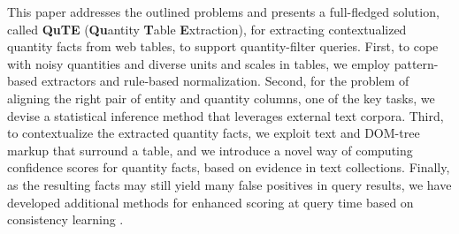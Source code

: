 \vspace{0.1cm}
%
%
This paper addresses the outlined problems and presents
a full-fledged solution, called {\bf QuTE} (\textbf{Qu}antity \textbf{T}able \textbf{E}xtraction), for extracting contextualized quantity facts
from web tables, to support quantity-filter queries. 
First, to cope with noisy quantities and diverse units and scales in tables, we employ pattern-based extractors and 
rule-based normalization.
Second, for the problem of aligning the right pair
of entity and quantity columns, one of the key tasks, 
we devise a statistical inference method
that leverages external text corpora.
Third, to contextualize the extracted quantity facts,
we exploit text and DOM-tree markup that surround a table, and we introduce a novel way of computing confidence scores for quantity facts, based on evidence in text collections.
%
Finally, as the resulting facts may still yield
many 
false positives in query results,
we have developed additional methods for
enhanced scoring at query time
based on consistency learning
\cite{DBLP:conf/mir/YagnikI07}.



